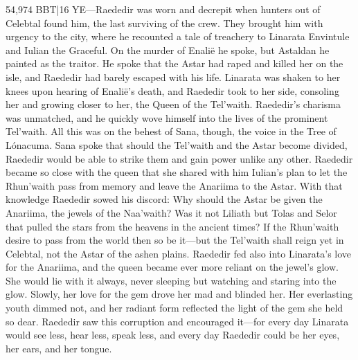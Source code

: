 \documentclass[smalldemyvopaper,11pt,twoside,onecolumn,openright,extrafontsizes]{memoir}
\begin{document}
54,974 BBT|16 YE—Raededir was worn and decrepit when hunters out of Celebtal found him, the last surviving of the crew. They brought him with urgency to the city, where he recounted a tale of treachery to Linarata Envintule and Iulian the Graceful. On the murder of Enalië he spoke, but Astaldan he painted as the traitor. He spoke that the Astar had raped and killed her on the isle, and Raededir had barely escaped with his life. Linarata was shaken to her knees upon hearing of Enalië’s death, and Raededir took to her side, consoling her and growing closer to her, the Queen of the Tel’waith. Raededir’s charisma was unmatched, and he quickly wove himself into the lives of the prominent Tel’waith. All this was on the behest of Sana, though, the voice in the Tree of Lónacuma. Sana spoke that should the Tel’waith and the Astar become divided, Raededir would be able to strike them and gain power unlike any other. Raededir became so close with the queen that she shared with him Iulian’s plan to let the Rhun’waith pass from memory and leave the Anariima to the Astar. With that knowledge Raededir sowed his discord: Why should the Astar be given the Anariima, the jewels of the Naa’waith? Was it not Liliath but Tolas and Selor that pulled the stars from the heavens in the ancient times? If the Rhun’waith desire to pass from the world then so be it—but the Tel’waith shall reign yet in Celebtal, not the Astar of the ashen plains. Raededir fed also into Linarata’s love for the Anariima, and the queen became ever more reliant on the jewel’s glow. She would lie with it always, never sleeping but watching and staring into the glow. Slowly, her love for the gem drove her mad and blinded her. Her everlasting youth dimmed not, and her radiant form reflected the light of the gem she held so dear. Raededir saw this corruption and encouraged it—for every day Linarata would see less, hear less, speak less, and every day Raededir could be her eyes, her ears, and her tongue. 
\end{document}
